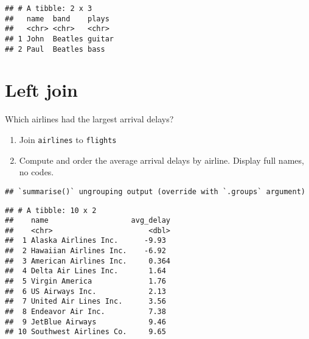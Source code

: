 \documentclass[
]{article}
\newenvironment{Shaded}{\begin{snugshade}}{\end{snugshade}}
\newcommand{\DataTypeTok}[1]{\textcolor[rgb]{0.13,0.29,0.53}{#1}}
\newcommand{\DecValTok}[1]{\textcolor[rgb]{0.00,0.00,0.81}{#1}}
\newcommand{\KeywordTok}[1]{\textcolor[rgb]{0.13,0.29,0.53}{\textbf{#1}}}
\newcommand{\NormalTok}[1]{#1}
\newcommand{\OperatorTok}[1]{\textcolor[rgb]{0.81,0.36,0.00}{\textbf{#1}}}
\newcommand{\OtherTok}[1]{\textcolor[rgb]{0.56,0.35,0.01}{#1}}
\newcommand{\StringTok}[1]{\textcolor[rgb]{0.31,0.60,0.02}{#1}}
\providecommand{\tightlist}{%
  \setlength{\itemsep}{0pt}\setlength{\parskip}{0pt}}
\begin{document}
\begin{verbatim}
## # A tibble: 2 x 3
##   name  band    plays 
##   <chr> <chr>   <chr> 
## 1 John  Beatles guitar
## 2 Paul  Beatles bass
\end{verbatim}

\hypertarget{left-join}{%
\section{Left join}\label{left-join}}

Which airlines had the largest arrival delays?

\begin{enumerate}
\def\labelenumi{\arabic{enumi}.}
\tightlist
\item
  Join \texttt{airlines} to \texttt{flights}
\item
  Compute and order the average arrival delays by airline. Display full
  names, no codes.
\end{enumerate}

\begin{Shaded}
\end{Shaded}

\begin{verbatim}
## `summarise()` ungrouping output (override with `.groups` argument)
\end{verbatim}

\begin{verbatim}
## # A tibble: 10 x 2
##    name                   avg_delay
##    <chr>                      <dbl>
##  1 Alaska Airlines Inc.      -9.93 
##  2 Hawaiian Airlines Inc.    -6.92 
##  3 American Airlines Inc.     0.364
##  4 Delta Air Lines Inc.       1.64 
##  5 Virgin America             1.76 
##  6 US Airways Inc.            2.13 
##  7 United Air Lines Inc.      3.56 
##  8 Endeavor Air Inc.          7.38 
##  9 JetBlue Airways            9.46 
## 10 Southwest Airlines Co.     9.65
\end{verbatim}
\end{document}
